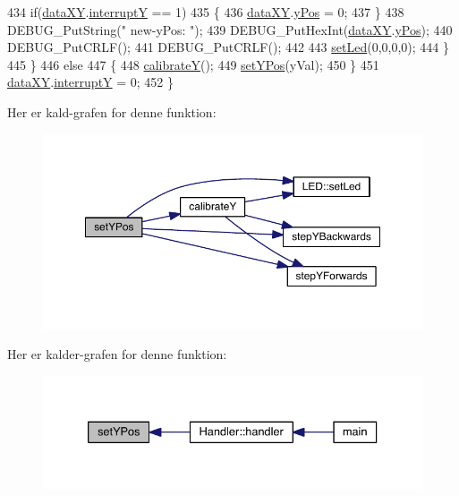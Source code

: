 \begin{DoxyCode}
434       \textcolor{keywordflow}{if}(\hyperlink{data_8h_a89d7998a721b3f36f9f4131e7a5e42d2}{dataXY}.\hyperlink{data_8h_a0149ea97a32442280eb1c0b30c1eeaf1}{interruptY} == 1)
435       \{
436         \hyperlink{data_8h_a89d7998a721b3f36f9f4131e7a5e42d2}{dataXY}.\hyperlink{data_8h_a4c7347df04ab0f3d860046571be08af4}{yPos} = 0;
437       \}
438       DEBUG\_PutString(\textcolor{stringliteral}{" new-yPos: "});
439       DEBUG\_PutHexInt(\hyperlink{data_8h_a89d7998a721b3f36f9f4131e7a5e42d2}{dataXY}.\hyperlink{data_8h_a4c7347df04ab0f3d860046571be08af4}{yPos});
440       DEBUG\_PutCRLF();
441       DEBUG\_PutCRLF();
442       
443       \hyperlink{led_8h_a1d8e725e3829da99c1d027ba0a2ce57a}{setLed}(0,0,0,0);
444     \}
445   \}
446   \textcolor{keywordflow}{else}
447   \{
448     \hyperlink{class_x_y_a86751f168bdc352fa109644298829609}{calibrateY}();
449     \hyperlink{class_x_y_adbc3a49d939491e88137a7677ad889f3}{setYPos}(yVal);
450   \}
451   \hyperlink{data_8h_a89d7998a721b3f36f9f4131e7a5e42d2}{dataXY}.\hyperlink{data_8h_a0149ea97a32442280eb1c0b30c1eeaf1}{interruptY} = 0;
452 \}
\end{DoxyCode}


Her er kald-\/grafen for denne funktion\+:\nopagebreak
\begin{figure}[H]
\begin{center}
\leavevmode
\includegraphics[width=350pt]{db/d87/class_x_y_adbc3a49d939491e88137a7677ad889f3_cgraph}
\end{center}
\end{figure}




Her er kalder-\/grafen for denne funktion\+:\nopagebreak
\begin{figure}[H]
\begin{center}
\leavevmode
\includegraphics[width=333pt]{db/d87/class_x_y_adbc3a49d939491e88137a7677ad889f3_icgraph}
\end{center}
\end{figure}


